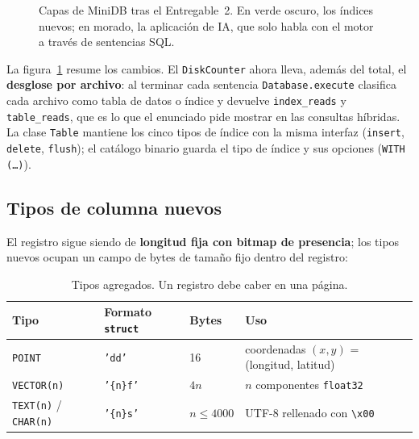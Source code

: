 \documentclass[11pt,a4paper]{article}
\newcommand{\code}[1]{\texttt{#1}}
\begin{document}
\begin{figure}[H]
\caption{Capas de MiniDB tras el Entregable~2. En verde oscuro, los índices nuevos; en morado, la
aplicación de IA, que solo habla con el motor a través de sentencias SQL.}
\label{fig:arq}
\end{figure}

La figura~\ref{fig:arq} resume los cambios. El \code{DiskCounter} ahora lleva, además del total, el
\textbf{desglose por archivo}: al terminar cada sentencia \code{Database.execute} clasifica cada
archivo como tabla de datos o índice y devuelve \code{index\_reads} y \code{table\_reads}, que es lo
que el enunciado pide mostrar en las consultas híbridas. La clase \code{Table} mantiene los cinco
tipos de índice con la misma interfaz (\code{insert}, \code{delete}, \code{flush}); el catálogo
binario guarda el tipo de índice y sus opciones (\code{WITH (\dots)}).

\subsection{Tipos de columna nuevos}

El registro sigue siendo de \textbf{longitud fija con bitmap de presencia}; los tipos nuevos ocupan
un campo de bytes de tamaño fijo dentro del registro:

\begin{table}[H]
\centering\small
\begin{tabular}{@{}llll@{}}
\toprule
Tipo & Formato \code{struct} & Bytes & Uso \\
\midrule
\code{POINT} & \code{'dd'} & 16 & coordenadas $(x, y)$ = (longitud, latitud) \\
\code{VECTOR(n)} & \code{'\{n\}f'} & $4n$ & $n$ componentes \code{float32} \\
\code{TEXT(n)} / \code{CHAR(n)} & \code{'\{n\}s'} & $n \le 4000$ & UTF-8 rellenado con \code{\textbackslash x00} \\
\bottomrule
\end{tabular}
\caption{Tipos agregados. Un registro debe caber en una página.}
\end{table}
\end{document}
